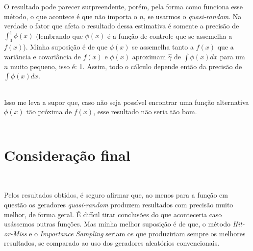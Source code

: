 \documentclass[pt12]{article}
\begin{document}
O resultado pode parecer surpreendente, porém, pela forma como funciona esse método, o que acontece é que não importa o $n$, se usarmos o \textit{quasi-random}. Na verdade o fator que afeta o resultado dessa estimativa é somente a precisão de $\displaystyle{\int_{0}^{1} \phi(x)}$ (lembrando que $\phi(x)$ é a função de controle que se assemelha a $f(x)$). Minha suposição é de que $\phi(x)$ se assemelha tanto a $f(x)$ que a variância e covariância de $f(x)$ e $\phi(x)$ aproximam $\hat{\gamma}$ de $\int\phi(x) dx$ para um $n$ muito pequeno, isso é: 1. Assim, todo o cálculo depende então da precisão de $\int\phi(x)dx$.\\
\ 

Isso me leva a supor que, caso não seja possível encontrar uma função alternativa $\phi(x)$ tão próxima de $f(x)$, esse resultado não seria tão bom.\\
\ 

\section{Consideração final}
\ 

Pelos resultados obtidos, é seguro afirmar que, ao menos para a função em questão os geradores \textit{quasi-random} produzem resultados com precisão muito melhor, de forma geral. É difícil tirar conclusões do que aconteceria caso usássemos outras funções. Mas minha melhor suposição é de que, o método \textit{Hit-or-Miss} e o \textit{Importance Sampling} seriam os que produziriam sempre os melhores resultados, se comparado ao uso dos geradores aleatórios convencionais.
\end{document}
